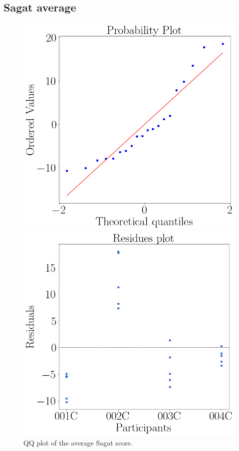 \subsection{Sagat average}

\begin{figure}[!htb]
    \begin{minipage}{0.45\linewidth}
        \centering
        \includegraphics[width = \linewidth]{Resultados/ECG/Figuras/png/qqplot_bpm.png}
        \caption{QQ plot of the average Sagat score.}
        \label{fig:qqplot_sagat_average}
    \end{minipage}
    \begin{minipage}{0.1\linewidth}
        \hfill
    \end{minipage}
    \begin{minipage}{0.45\linewidth}
        \centering
        \includegraphics[width = \linewidth]{Resultados/ECG/Figuras/png/residplot_bpm.png}

\end{minipage}
\end{figure}
